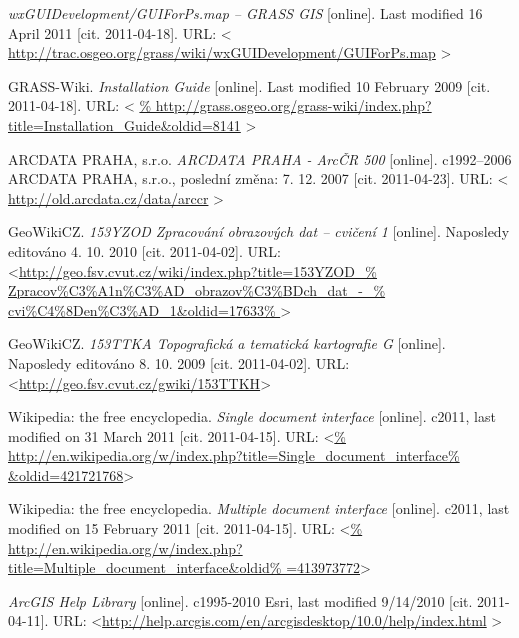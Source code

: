 \documentclass[a4paper,12pt,draft]{article}
\begin{document}
\begin{thebibliography}{99}
\textit{wxGUIDevelopment/GUIForPs.map -- GRASS GIS} [online]. Last modified
16 April 2011 [cit. 2011-04-18]. URL: \textless
\url{http://trac.osgeo.org/grass/wiki/wxGUIDevelopment/GUIForPs.map}
\textgreater


GRASS-Wiki. \textit{Installation Guide} [online]. Last modified
10 February 2009 [cit. 2011-04-18]. URL: \textless
\url{%
http://grass.osgeo.org/grass-wiki/index.php?title=Installation_Guide&oldid=8141}
\textgreater



ARCDATA PRAHA, s.r.o. \textit{ARCDATA PRAHA - ArcČR 500} [online].
c1992–2006 ARCDATA PRAHA, s.r.o., poslední změna: 7. 12. 2007 [cit. 2011-04-23].
URL: \textless
\url{http://old.arcdata.cz/data/arccr} \textgreater



GeoWikiCZ. \textit{153YZOD Zpracování obrazových dat -- cvičení 1} [online].
Naposledy editováno 4. 10. 2010 [cit. 2011-04-02].
URL: \textless\url{http://geo.fsv.cvut.cz/wiki/index.php?title=153YZOD_%
Zpracov\%C3\%A1n\%C3\%AD_obrazov\%C3\%BDch_dat_-_%
cvi\%C4\%8Den\%C3\%AD_1&oldid=17633%
}\textgreater



GeoWikiCZ. \textit{153TTKA Topografická a tematická kartografie G} [online].
Naposledy editováno 8. 10. 2009 [cit. 2011-04-02].
URL: \textless\url{http://geo.fsv.cvut.cz/gwiki/153TTKH}\textgreater


Wikipedia: the free encyclopedia. \textit{Single document interface}
[online]. c2011, last modified on 31 March 2011 [cit. 2011-04-15]. URL: 
\textless\url{%
http://en.wikipedia.org/w/index.php?title=Single_document_interface%
&oldid=421721768}\textgreater

Wikipedia: the free encyclopedia. \textit{Multiple document interface}
[online]. c2011, last modified on 15 February 2011 [cit. 2011-04-15]. URL:
\textless\url{%
http://en.wikipedia.org/w/index.php?title=Multiple_document_interface&oldid%
=413973772}\textgreater




\textit{ArcGIS Help Library} [online].  c1995-2010 Esri, last modified
9/14/2010 [cit. 2011-04-11].
URL: \textless\url{http://help.arcgis.com/en/arcgisdesktop/10.0/help/index.html}
\textgreater


\end{thebibliography}
\end{document}

